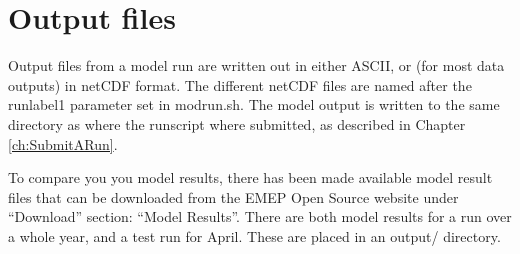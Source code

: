 \chapter{Output files}
\label{ch:output}

Output files from a model run are written out in either ASCII, or
(for most data outputs) in netCDF format. 
The different netCDF files are named after the runlabel1 parameter set in modrun.sh. 
The model output is written to the same directory as where the runscript where submitted, as described 
in Chapter \ref{ch:SubmitARun}.

To compare you you model results, there has been made available model result files 
that can be downloaded  from the EMEP Open Source website under ``Download'' section: ``Model Results''. 
There are both model results for a run over a whole year, and a test run for April. 
These are placed in an output/ directory. 
 

